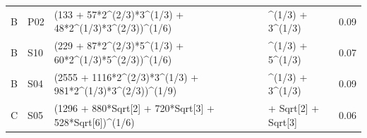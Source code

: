 \documentclass[11pt,oneside]{article}
\numberwithin{equation}{section}
\theoremstyle{definition}
\theoremstyle{remark}
\begin{document}
\begin{small}
\begin{longtable}{@{}p{}p{}>{\ttfamily\footnotesize\raggedright\arraybackslash}p{}>{\ttfamily\footnotesize\raggedright\arraybackslash}p{}p{}@{}}
B & P02 & (\allowbreak{}133 + \allowbreak{}57*\allowbreak{}2\textasciicircum{}\allowbreak{}(\allowbreak{}2/\allowbreak{}3)\allowbreak{}*\allowbreak{}3\textasciicircum{}\allowbreak{}(\allowbreak{}1/\allowbreak{}3)\allowbreak{} + \allowbreak{}48*\allowbreak{}2\textasciicircum{}\allowbreak{}(\allowbreak{}1/\allowbreak{}3)\allowbreak{}*\allowbreak{}3\textasciicircum{}\allowbreak{}(\allowbreak{}2/\allowbreak{}3)\allowbreak{})\allowbreak{}\textasciicircum{}\allowbreak{}(\allowbreak{}1/\allowbreak{}6)\allowbreak{} & 2\textasciicircum{}\allowbreak{}(\allowbreak{}1/\allowbreak{}3)\allowbreak{} + \allowbreak{}3\textasciicircum{}\allowbreak{}(\allowbreak{}1/\allowbreak{}3)\allowbreak{} & 0.09\\
B & S10 & (\allowbreak{}229 + \allowbreak{}87*\allowbreak{}2\textasciicircum{}\allowbreak{}(\allowbreak{}2/\allowbreak{}3)\allowbreak{}*\allowbreak{}5\textasciicircum{}\allowbreak{}(\allowbreak{}1/\allowbreak{}3)\allowbreak{} + \allowbreak{}60*\allowbreak{}2\textasciicircum{}\allowbreak{}(\allowbreak{}1/\allowbreak{}3)\allowbreak{}*\allowbreak{}5\textasciicircum{}\allowbreak{}(\allowbreak{}2/\allowbreak{}3)\allowbreak{})\allowbreak{}\textasciicircum{}\allowbreak{}(\allowbreak{}1/\allowbreak{}6)\allowbreak{} & 2\textasciicircum{}\allowbreak{}(\allowbreak{}1/\allowbreak{}3)\allowbreak{} + \allowbreak{}5\textasciicircum{}\allowbreak{}(\allowbreak{}1/\allowbreak{}3)\allowbreak{} & 0.07\\
B & S04 & (\allowbreak{}2555 + \allowbreak{}1116*\allowbreak{}2\textasciicircum{}\allowbreak{}(\allowbreak{}2/\allowbreak{}3)\allowbreak{}*\allowbreak{}3\textasciicircum{}\allowbreak{}(\allowbreak{}1/\allowbreak{}3)\allowbreak{} + \allowbreak{}981*\allowbreak{}2\textasciicircum{}\allowbreak{}(\allowbreak{}1/\allowbreak{}3)\allowbreak{}*\allowbreak{}3\textasciicircum{}\allowbreak{}(\allowbreak{}2/\allowbreak{}3)\allowbreak{})\allowbreak{}\textasciicircum{}\allowbreak{}(\allowbreak{}1/\allowbreak{}9)\allowbreak{} & 2\textasciicircum{}\allowbreak{}(\allowbreak{}1/\allowbreak{}3)\allowbreak{} + \allowbreak{}3\textasciicircum{}\allowbreak{}(\allowbreak{}1/\allowbreak{}3)\allowbreak{} & 0.09\\
C & S05 & (\allowbreak{}1296 + \allowbreak{}880*\allowbreak{}Sqrt[\allowbreak{}2]\allowbreak{} + \allowbreak{}720*\allowbreak{}Sqrt[\allowbreak{}3]\allowbreak{} + \allowbreak{}528*\allowbreak{}Sqrt[\allowbreak{}6]\allowbreak{})\allowbreak{}\textasciicircum{}\allowbreak{}(\allowbreak{}1/\allowbreak{}6)\allowbreak{} & 1 + \allowbreak{}Sqrt[\allowbreak{}2]\allowbreak{} + \allowbreak{}Sqrt[\allowbreak{}3]\allowbreak{} & 0.06\\

\end{longtable}
\end{small}
\end{document}
